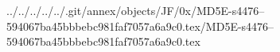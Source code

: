 ../../../../../.git/annex/objects/JF/0x/MD5E-s4476--594067ba45bbbebc981faf7057a6a9c0.tex/MD5E-s4476--594067ba45bbbebc981faf7057a6a9c0.tex